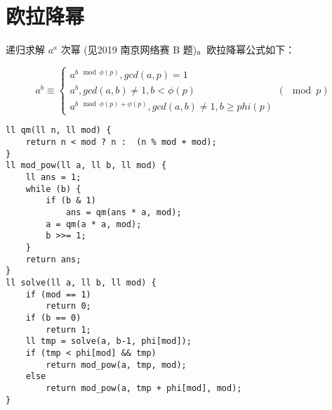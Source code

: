 \section{欧拉降幂}

递归求解 $a^a$ 次幂 (见2019 南京网络赛 B 题)。欧拉降幂公式如下：

$$a^b \equiv \begin{cases} a ^{b \mod \phi(p)}, gcd(a, p) = 1 \\ a ^ b, gcd(a, b) \ne 1, b < \phi(p) \\ a^{b \mod \phi(p) + \phi(p)}, gcd(a, b) \ne 1, b \ge phi(p) \end{cases} (\mod p)$$

\begin{verbatim}
ll qm(ll n, ll mod) {
    return n < mod ? n :  (n % mod + mod);
}
ll mod_pow(ll a, ll b, ll mod) {
    ll ans = 1;
    while (b) {
        if (b & 1)
            ans = qm(ans * a, mod);
        a = qm(a * a, mod);
        b >>= 1;
    }
    return ans;
}
ll solve(ll a, ll b, ll mod) {
    if (mod == 1)
        return 0;
    if (b == 0)
        return 1;
    ll tmp = solve(a, b-1, phi[mod]);
    if (tmp < phi[mod] && tmp)
        return mod_pow(a, tmp, mod);
    else
        return mod_pow(a, tmp + phi[mod], mod);
}
\end{verbatim}
